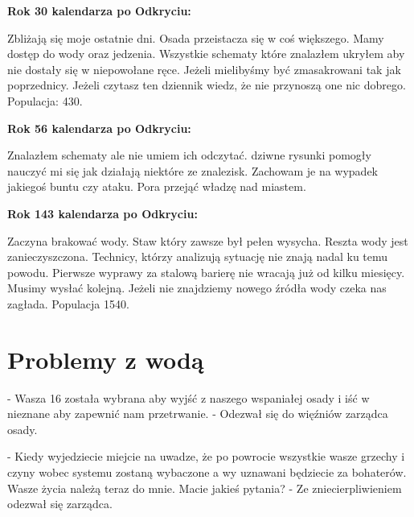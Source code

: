 \documentclass{article}
\newcommand{\textbb}[1]{
        \smallskip
        \textbf{{#1}}
        \smallskip
    }
\begin{document}
    \textbb{Rok 30 kalendarza po Odkryciu:}

    Zbliżają się moje ostatnie dni. Osada przeistacza się w coś większego. Mamy dostęp do wody oraz jedzenia. Wszystkie schematy które znalazłem ukryłem aby nie dostały się w niepowołane ręce. Jeżeli mielibyśmy być zmasakrowani tak jak poprzednicy. Jeżeli czytasz ten dziennik wiedz, że nie przynoszą one nic dobrego. Populacja: 430.

    \textbb{Rok 56 kalendarza po Odkryciu:}

    Znalazłem schematy ale nie umiem ich odczytać. dziwne rysunki pomogły nauczyć mi się jak działają niektóre ze znalezisk. Zachowam je na wypadek jakiegoś buntu czy ataku. Pora przejąć władzę nad miastem.

    \textbb{Rok 143 kalendarza po Odkryciu:}

    Zaczyna brakować wody. Staw który zawsze był pełen wysycha. Reszta wody jest zanieczyszczona. Technicy, którzy analizują sytuację nie znają nadal ku temu powodu. Pierwsze wyprawy za stalową barierę nie wracają już od kilku miesięcy. Musimy wysłać kolejną. Jeżeli nie znajdziemy nowego źródła wody czeka nas zagłada. Populacja 1540.

    \section{Problemy z wodą}
    - Wasza 16 została wybrana aby wyjść z naszego wspaniałej osady i iść w nieznane aby zapewnić nam przetrwanie. - Odezwał się do więźniów zarządca osady.

    - Kiedy wyjedziecie miejcie na uwadze, że po powrocie wszystkie wasze grzechy i czyny wobec systemu zostaną wybaczone a wy uznawani będziecie za bohaterów. Wasze życia należą teraz do mnie. Macie jakieś pytania? - Ze zniecierpliwieniem odezwał się zarządca.\bigskip
\end{document}
